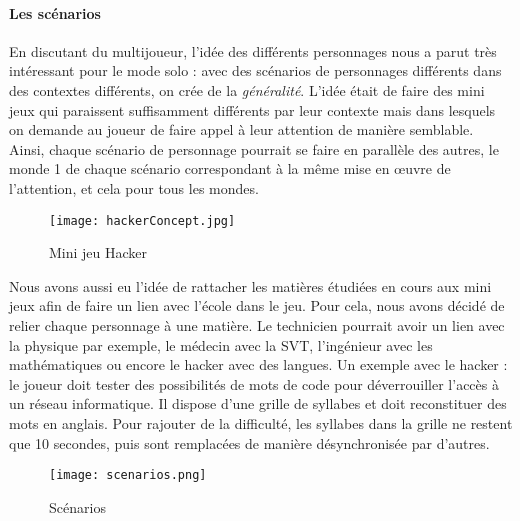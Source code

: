 \newpage
\paragraph{Les scénarios}En discutant du multijoueur, l'idée des différents personnages nous a parut très intéressant pour le mode solo : avec des scénarios de personnages différents
dans des contextes différents, on crée de la \emph{généralité}. L'idée était de faire des mini jeux qui paraissent suffisamment différents par leur contexte mais dans lesquels on
demande au joueur de faire appel à leur attention de manière semblable. Ainsi, chaque scénario de personnage pourrait se faire en parallèle des autres, le monde 1 de chaque scénario
correspondant à la même mise en œuvre de l'attention, et cela pour tous les mondes. 

\begin{wrapfigure}[11]{l}{6cm}
    \vspace{-25pt}
    \begin{center}
    \texttt{[image: hackerConcept.jpg]}
    \end{center}
    \captionsetup{labelformat=simpleNumber}
    \caption{Mini jeu Hacker}
\label{Hacker}
\end{wrapfigure}

Nous avons aussi eu l'idée de rattacher les matières étudiées en cours aux mini jeux afin de faire un lien avec l'école dans le jeu. Pour cela, nous avons décidé de relier chaque
personnage à une matière. Le technicien pourrait avoir un lien avec la physique par exemple, le médecin avec la SVT, l'ingénieur avec les mathématiques ou encore le hacker avec des
langues. Un exemple avec le hacker : le joueur doit tester des possibilités de mots de code pour déverrouiller l'accès à un réseau informatique. Il dispose d'une grille de syllabes et
doit reconstituer des mots en anglais. Pour rajouter de la difficulté, les syllabes dans la grille ne restent que 10 secondes, puis sont remplacées de manière désynchronisée par
d'autres.

\begin{figure}[H]
    \begin{center}
    \texttt{[image: scenarios.png]}
    \end{center}
    \caption{Scénarios}
\label{Scenarios}
\end{figure}